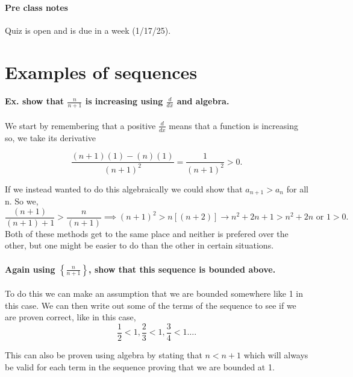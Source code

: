\paragraph{Pre class notes}%
Quiz is open and is due in a week (1/17/25).

\section{Examples of sequences}%
\label{sec:Examples of sequences}

\paragraph{Ex. show that $ \frac{ n }{ n+1 }  $ is increasing using $ \frac{ d }{ dx }  $ and algebra. \\}

 We start by remembering that a positive $ \frac{ d }{ dx }  $ means that a function is increasing so, we take its derivative

 \[
 \frac{ \left( n+1 \right) \left( 1 \right) -\left( n \right) \left( 1 \right)  }{ \left( n+1 \right) ^2 } = \frac{ 1 }{ \left( n+1 \right) ^2 } >0
 .\] 

If we instead wanted to do this algebraically we could show that $ a_{ n+1 }>a_n $ for all n. So we,
\[
\frac{ \left( n+1 \right)  }{ \left( n+1 \right) +1 }>\frac{ n }{ \left( n+1 \right)  } \implies \left( n+1 \right) ^2 > n\left[ \left( n+2 \right)  \right] \to n^2+2n+1> n^2+2n \text{ or } 1>0
.\] 
Both of these methods get to the same place and neither is prefered over the other, but one might be easier to do than the other in certain situations.

\paragraph{Again using $ \left\{ \frac{ n }{ n+1 }  \right\}  $, show that this sequence is bounded above. \\}

To do this we can make an assumption that we are bounded somewhere like 1 in this case. We can then write out some of the terms of the sequence to see if we are proven correct, like in this case,
\[
\frac{ 1 }{ 2 } <1, \frac{ 2 }{ 3 } <1, \frac{ 3 }{ 4 } <1 \ldots
.\] 

This can also be proven using algebra by stating that $ n<n+1 $ which will always be valid for each term in the sequence proving that we are bounded at 1. 

